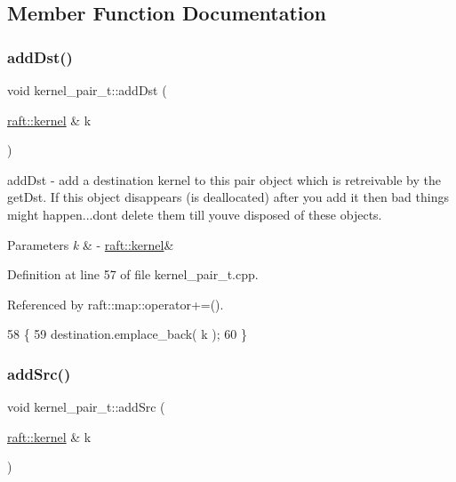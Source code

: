 \subsection{Member Function Documentation}
\hypertarget{classkernel__pair__t_ae22da5b3353d0ccc24d88f87506f5ed4}{}\label{classkernel__pair__t_ae22da5b3353d0ccc24d88f87506f5ed4} 
\subsubsection{\texorpdfstring{add\+Dst()}{addDst()}}
{\footnotesize\ttfamily void kernel\+\_\+pair\+\_\+t\+::add\+Dst (\begin{DoxyParamCaption}\item[{\hyperlink{classraft_1_1kernel}{raft\+::kernel} \&}]{k }\end{DoxyParamCaption})\hspace{0.3cm}{\ttfamily [noexcept]}}

add\+Dst -\/ add a destination kernel to this pair object which is retreivable by the get\+Dst. If this object disappears (is deallocated) after you add it then bad things might happen...don\textquotesingle{}t delete them till you\textquotesingle{}ve disposed of these objects. 
\begin{DoxyParams}{Parameters}
{\em k} & -\/ \hyperlink{classraft_1_1kernel}{raft\+::kernel}\& \\
\hline
\end{DoxyParams}


Definition at line 57 of file kernel\+\_\+pair\+\_\+t.\+cpp.



Referenced by raft\+::map\+::operator+=().


\begin{DoxyCode}
58 \{
59     destination.emplace\_back( k );
60 \}
\end{DoxyCode}
\hypertarget{classkernel__pair__t_a73351e6699a9243b48df6492f12c83ad}{}\label{classkernel__pair__t_a73351e6699a9243b48df6492f12c83ad} 
\subsubsection{\texorpdfstring{add\+Src()}{addSrc()}}
{\footnotesize\ttfamily void kernel\+\_\+pair\+\_\+t\+::add\+Src (\begin{DoxyParamCaption}\item[{\hyperlink{classraft_1_1kernel}{raft\+::kernel} \&}]{k }\end{DoxyParamCaption})\hspace{0.3cm}{\ttfamily [noexcept]}}

